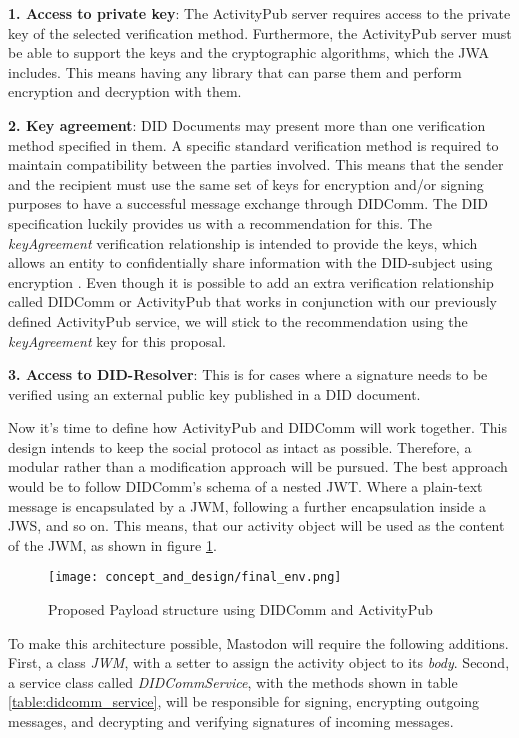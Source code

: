 \textbf{1. Access to private key}: The ActivityPub server requires access to the private key of the selected verification method. Furthermore, the ActivityPub server must be able to support the keys and the cryptographic algorithms, which the JWA includes. This means having any library that can parse them and perform encryption and decryption with them.

\textbf{2. Key agreement}: DID Documents may present more than one verification method specified in them. A specific standard verification method is required to maintain compatibility between the parties involved. This means that the sender and the recipient must use the same set of keys for encryption and/or signing purposes to have a successful message exchange through DIDComm. The DID specification luckily provides us with a recommendation for this. The \emph{keyAgreement} verification relationship is intended to provide the keys, which allows an entity to confidentially share information with the DID-subject using encryption \cite{sporny_longley_sabadello_reed_steele_2021}. Even though it is possible to add an extra verification relationship called DIDComm or ActivityPub that works in conjunction with our previously defined ActivityPub service, we will stick to the recommendation using the \emph{keyAgreement} key for this proposal.

\textbf{3. Access to DID-Resolver}: This is for cases where a signature needs to be verified using an external public key published in a DID document. 

Now it's time to define how ActivityPub and DIDComm will work together. This design intends to keep the social protocol as intact as possible. Therefore, a modular rather than a modification approach will be pursued. The best approach would be to follow DIDComm's schema of a nested JWT. Where a plain-text message is encapsulated by a JWM, following a further encapsulation inside a JWS, and so on. This means, that our activity object will be used as the content of the JWM, as shown in figure \ref{fig:final_env}.

\begin{figure}[h]
  \centering
  \texttt{[image: concept\_and\_design/final\_env.png]}
  \caption{Proposed Payload structure using DIDComm and ActivityPub}
  \label{fig:final_env}
\end{figure}

To make this architecture possible, Mastodon will require the following additions. First, a class \emph{JWM}, with a setter to assign the activity object to its \emph{body}. Second, a service class called \emph{DIDCommService}, with the methods shown in table \ref{table:didcomm_service}, will be responsible for signing, encrypting outgoing messages, and decrypting and verifying signatures of incoming messages. 

